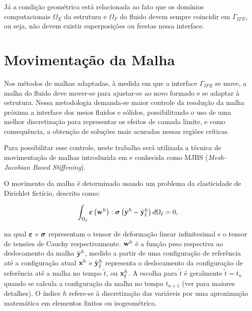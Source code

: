 \documentclass[tese_patricia]{subfiles}
\begin{document}
Já a condição geométrica está relacionada ao fato que os domínios computacionais $\Omega_E$ da estrutura e $\Omega_F$ do fluido devem sempre coincidir em $\Gamma_{IFE}$, ou seja, não devem existir superposições ou frestas nessa interface.

\section{Movimentação da Malha} \label{section:MovMalha}

Nos métodos de malhas adaptadas, à medida em que a interface $\Gamma_{IFE}$ se move, a malha do fluido deve mover-se para ajustar-se ao novo formado e se adaptar à estrutura. Nessa metodologia demanda-se maior controle da resolução da malha próxima a interface dos meios fluidos e sólidos, possibilitando o uso de uma melhor discretização para representar os efeitos de camada limite, e como consequência, a obtenção de soluções mais acuradas nessas regiões críticas.

Para possibilitar esse controle, neste trabalho será utilizada a técnica de movimentação de malhas introduzida em  e  conhecida como MJBS (\textit{Mesh-Jacobian Based Stiffening}).

O movimento da malha é determinado usando um problema da elasticidade de Dirichlet fictício, descrito como:

\begin{align}
	\int_{\Omega_{\tilde{t}}} \bm{\varepsilon} \left(\mathbf{w}^h\right) : \boldsymbol{\sigma} \left(\bar{\mathbf{y}}^h - \bar{\mathbf{y}}^h_{\tilde{t}}\right) d\Omega_{\tilde{t}} = 0,
	\label{eq:elasticityequation}
\end{align}

\noindent na qual $\bm{\varepsilon}$ e $\boldsymbol{\sigma}$ representam o tensor de deformação linear infinitesimal e o tensor de tensões de Cauchy respectivamente. $\mathbf{w}^h$ é a função peso respectiva ao deslocamento da malha  $\bar{\mathbf{y}}^h$, medido a partir de uma configuração de referência até a configuração atual $\mathbf{x}^h$ e 
$\bar{\mathbf{y}}^h_{\tilde{t}}$ representa o deslocamento da configuração de referência até a malha no tempo ${\tilde{t}}$, ou $\mathbf{x}^h_{\tilde{t}}$. 
A escolha para ${\tilde{t}}$ é geralmente ${\tilde{t}} = {t_{n}}$ quando se calcula a configuração da malha no tempo ${t_{n+1}}$ (ver  para maiores detalhes). O índice $h$ refere-se à discretização das variáveis por uma aproximação matemática em elementos finitos ou isogeométrica.
\end{document}
